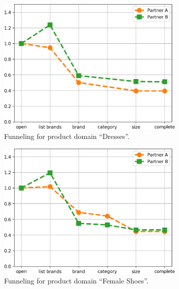 \documentclass[12pt,a4paper]{article}
\begin{document}
    
    \newpage
    
    \label{s:pd-dresses}
    
    \begin{figure}[p]
        \centering
        \includegraphics[width=0.8\textwidth]{../py/OUTPUT/funnel/img/product=Dresses.png}
        \caption{Funneling for product domain ``Dresses''.}
        \label{f:pd_dresses}
    \end{figure}

    
    \begin{figure}[p]
        \centering
        \includegraphics[width=0.8\textwidth]{../py/OUTPUT/funnel/img/product=Female_Shoes.png}
        \caption{Funneling for product domain ``Female Shoes''.}
        \label{f:pd_shoes}
    \end{figure}
    
\end{document}
